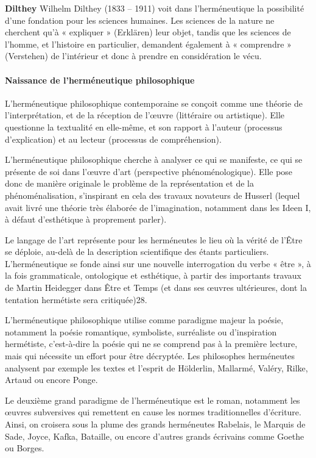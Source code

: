 \textbf{Dilthey}
Wilhelm Dilthey (1833 – 1911) voit dans l'herméneutique la possibilité d'une fondation pour les sciences humaines. Les sciences de la nature ne cherchent qu'à « expliquer » (Erklären) leur objet, tandis que les sciences de l'homme, et l'histoire en particulier, demandent également à « comprendre » (Verstehen) de l'intérieur et donc à prendre en considération le vécu.

 \paragraph{Naissance de l'herméneutique philosophique}

L'herméneutique philosophique contemporaine se conçoit comme une théorie de l'interprétation, et de la réception de l'œuvre (littéraire ou artistique). Elle questionne la textualité en elle-même, et son rapport à l'auteur (processus d'explication) et au lecteur (processus de compréhension).

L'herméneutique philosophique cherche à analyser ce qui se manifeste, ce qui se présente de soi dans l'œuvre d'art (perspective phénoménologique). Elle pose donc de manière originale le problème de la représentation et de la phénoménalisation, s'inspirant en cela des travaux novateurs de Husserl (lequel avait livré une théorie très élaborée de l'imagination, notamment dans les Ideen I, à défaut d'esthétique à proprement parler).

Le langage de l'art représente pour les herméneutes le lieu où la vérité de l'Être se déploie, au-delà de la description scientifique des étants particuliers. L'herméneutique se fonde ainsi sur une nouvelle interrogation du verbe « être », à la fois grammaticale, ontologique et esthétique, à partir des importants travaux de Martin Heidegger dans Être et Temps (et dans ses œuvres ultérieures, dont la tentation hermétiste sera critiquée)28.

L'herméneutique philosophique utilise comme paradigme majeur la poésie, notamment la poésie romantique, symboliste, surréaliste ou d'inspiration hermétiste, c'est-à-dire la poésie qui ne se comprend pas à la première lecture, mais qui nécessite un effort pour être décryptée. Les philosophes herméneutes analysent par exemple les textes et l'esprit de Hölderlin, Mallarmé, Valéry, Rilke, Artaud ou encore Ponge.

Le deuxième grand paradigme de l'herméneutique est le roman, notamment les œuvres subversives qui remettent en cause les normes traditionnelles d'écriture. Ainsi, on croisera sous la plume des grands herméneutes Rabelais, le Marquis de Sade, Joyce, Kafka, Bataille, ou encore d'autres grands écrivains comme Goethe ou Borges.

